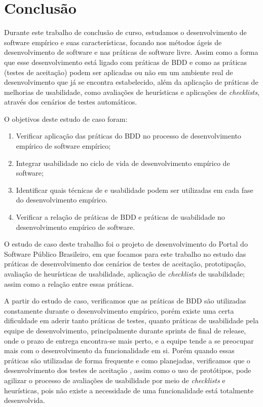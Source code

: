 \chapter{Conclusão}
\label{consideracoes-finais}

Durante este trabalho de conclusão de curso, estudamos o desenvolvimento de software empírico e suas características, focando nos métodos ágeis de desenvolvimento de software e nas práticas de software livre. Assim como a forma que esse desenvolvimento está ligado com práticas de BDD e como as práticas (testes de aceitação) podem ser aplicadas ou não em um ambiente real de desenvolvimento que já se encontra estabelecido, além da aplicação de práticas de melhorias de usabilidade, como avaliações de heurísticas e aplicações de \textit{checklists}, através dos cenários de testes automáticos.

O objetivos deste estudo de caso foram:
\begin{enumerate}
\item Verificar aplicação das práticas do BDD no processo de desenvolvimento empírico de software empírico;
\item Integrar usabilidade no ciclo de vida de desenvolvimento empírico de software;
\item Identificar quais técnicas de e usabilidade  podem ser utilizadas em cada fase do desenvolvimento empírico.
\item Verificar a relação de práticas de BDD e práticas de usabilidade no desenvolvimento empírico de software.
\end{enumerate}

O estudo de caso deste trabalho foi o projeto de desenvolvimento do Portal do Software Público Brasileiro, em que focamos para este trabalho no estudo das práticas de desenvolvimento dos cenários de testes de aceitação, prototipação, avaliação de heurísticas de usabilidade, aplicação de \textit{checklists} de usabilidade; assim como a relação entre essas práticas.

A partir do estudo de caso, verificamos que as práticas de BDD são utilizadas constamente durante o desenvolvimento empírico, porém existe uma certa dificuldade em aderir tanto práticas de testes, quanto práticas de usabilidade pela equipe de desenvolvimento, principalmente durante sprints de final de release, onde o prazo de entrega encontra-se mais perto, e a equipe tende a se preocupar mais com o desenvolvimento da funcionalidade em si. Porém quando essas práticas são utilizadas de forma frequente e como planejadas, verificamos que o desenvolvimento dos testes de aceitação , assim como o uso de protótipos, pode agilizar o processo de avaliações de usabilidade por meio de \textit{checklists} e heurísticas, pois não existe a necessidade de uma funcionalidade está totalmente desenvolvida. 

